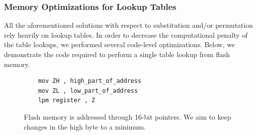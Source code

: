 \documentclass[11pt]{llncs2e} %
\begin{document}

 

\subsubsection{Memory Optimizations for Lookup Tables}
All the aforementioned solutions with respect to substitution and/or permutation rely heavily on lookup tables. In order to decrease the computational penalty of the table lookups, we performed several code-level optimizations. Below, we demonstrate the code required to perform a single table lookup from flash memory.

\begin{figure}[h]
\centering
	\begin{lstlisting}
	mov ZH , high_part_of_address
	mov ZL , low_part_of_address
	lpm register , Z
	\end{lstlisting}
	\caption{\footnotesize Flash memory is addressed through 16-bit pointers. We aim to keep changes in the high byte to a minimum.}
\label{unpacking_code}
\end{figure}
\end{document}
